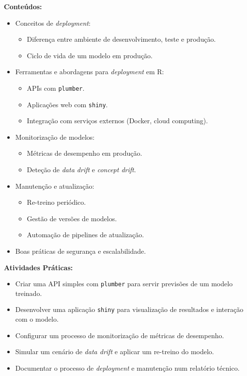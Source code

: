 \documentclass[12pt]{article}
\begin{document}
\textbf{Conteúdos:}
\begin{itemize}
  \item Conceitos de \textit{deployment}:
    \begin{itemize}
      \item Diferença entre ambiente de desenvolvimento, teste e produção.
      \item Ciclo de vida de um modelo em produção.
    \end{itemize}
  \item Ferramentas e abordagens para \textit{deployment} em R:
    \begin{itemize}
      \item APIs com \texttt{plumber}.
      \item Aplicações web com \texttt{shiny}.
      \item Integração com serviços externos (Docker, cloud computing).
    \end{itemize}
  \item Monitorização de modelos:
    \begin{itemize}
      \item Métricas de desempenho em produção.
      \item Deteção de \textit{data drift} e \textit{concept drift}.
    \end{itemize}
  \item Manutenção e atualização:
    \begin{itemize}
      \item Re-treino periódico.
      \item Gestão de versões de modelos.
      \item Automação de pipelines de atualização.
    \end{itemize}
  \item Boas práticas de segurança e escalabilidade.
\end{itemize}

\textbf{Atividades Práticas:}
\begin{itemize}
  \item Criar uma API simples com \texttt{plumber} para servir previsões de um modelo treinado.
  \item Desenvolver uma aplicação \texttt{shiny} para visualização de resultados e interação com o modelo.
  \item Configurar um processo de monitorização de métricas de desempenho.
  \item Simular um cenário de \textit{data drift} e aplicar um re-treino do modelo.
  \item Documentar o processo de \textit{deployment} e manutenção num relatório técnico.
\end{itemize}
\end{document}
